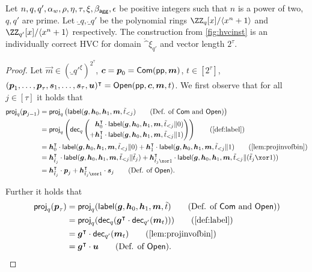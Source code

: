 \begin{lemma}\label{lem:veccomcorrectness}
  Let $n,q,q',\alpha_w,\rho,\eta,\tau,\xi,\beta_{\mathsf{agg}},\epsilon$ be positive integers such that $n$ is a power of two, $q,q'$ are prime.
  Let $\ring_q,\ring_{q'}$ be the polynomial rings $\ZZ_q[x]/\langle x^n+1\rangle$ and $\ZZ_{q'}[x]/\langle x^n+1\rangle$ respectively.
  The construction from \autoref{fig:hvcinst} is an individually correct HVC for domain $\ring^\xi_{q'}$ and vector length $2^\tau$.
\end{lemma}
\begin{proof}
Let $\vec{m} \in (\ring_{q'}^{\xi})^{2^\tau}$, $\boldsymbol{c} = \boldsymbol{p}_0 = \mathsf{Com}(\mathsf{pp},\boldsymbol{m})$, $t\in[2^\tau]$, $(\boldsymbol{p}_1,\dots,\boldsymbol{p}_{\tau},\boldsymbol{s}_1, \dots, \boldsymbol{s}_{\tau},\boldsymbol{u})^\intercal = \mathsf{Open}(\mathsf{pp},\boldsymbol{c},\boldsymbol{m},t)$.
We first observe that for all $j\in[\tau]$ it holds that
\begin{align*}
  \proj_q(\vec{p}_{j-1})
  ={}&\proj_q\left(\lbl(\vec{g},\vec{h}_0,\vec{h}_1,\vec{m},\tilde t_{< j})\tag{Def. of $\commit$ and $\open$}\right)\\
  ={}&\proj_q\left(\decomp_q\left(\begin{aligned}
  &\vec{h}_0^\intercal \cdot\lbl(\vec{g},\vec{h}_0,\vec{h}_1,\vec{m},\tilde t_{< j}\Vert 0)\\ +& \vec{h}_1^\intercal \cdot\lbl(\vec{g},\vec{h}_0,\vec{h}_1,\vec{m},\tilde t_{< j}\Vert 1)
  \end{aligned}\right)\right)\tag{\autoref{def:label}}\\
  ={}&\vec{h}_0^\intercal \cdot\lbl(\vec{g},\vec{h}_0,\vec{h}_1,\vec{m},\tilde t_{< j}\Vert 0) + \vec{h}_1^\intercal \cdot\lbl(\vec{g},\vec{h}_0,\vec{h}_1,\vec{m},\tilde t_{< j}\Vert 1)\tag{\autoref{lem:projinvofbin}}\\
  ={}&\vec{h}_{\tilde t_{j}}^\intercal \cdot\lbl(\vec{g},\vec{h}_0,\vec{h}_1,\vec{m},\tilde t_{< j}\Vert \tilde t_{j}) + \vec{h}_{\tilde t_{j}\xor 1}^\intercal \cdot\lbl(\vec{g},\vec{h}_0,\vec{h}_1,\vec{m},\tilde t_{< j}\Vert (\tilde t_{j}\xor 1))\\
  ={}&\vec{h}_{\tilde t_{j}}^\intercal \cdot\vec{p}_{j} + \vec{h}_{\tilde t_{j}\xor 1}^\intercal \cdot\vec{s}_{j}\tag{Def. of $\open$}.
\end{align*}

Further it holds that
\begin{align*}
  \proj_q(\vec{p}_{\tau})
  ={}&\proj_q(\lbl(\vec{g},\vec{h}_0,\vec{h}_1,\vec{m},\tilde t)\tag{Def. of $\commit$ and $\open$})\\
  ={}&\proj_q(\decomp_q(\vec{g}^\intercal\cdot \decomp_{q'}(\vec{m}_t)))\tag{\autoref{def:label}}\\
  ={}&\vec{g}^\intercal\cdot \decomp_{q'}(\vec{m}_t)\tag{\autoref{lem:projinvofbin}}\\
  ={}&\vec{g}^\intercal\cdot\vec{u}\tag{Def. of $\open$}.
\end{align*}



\end{proof}
